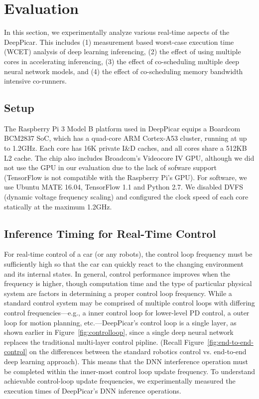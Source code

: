
\section{Evaluation}\label{sec:evaluation}

In this section, we experimentally analyze various real-time aspects
of the DeepPicar. This includes
(1) measurement based worst-case execution time (WCET) analysis of
deep learning inferencing,
(2) the effect of using multiple cores in accelerating inferencing,
(3) the effect of co-scheduling multiple deep neural network models,
and 
(4) the effect of co-scheduling memory bandwidth intensive co-runners.

\subsection{Setup}

The Raspberry Pi 3 Model B platform used in DeepPicar equips a Boardcom
BCM2837 SoC, which has a quad-core ARM Cortex-A53 cluster,
running at up to 1.2GHz. Each core has 16K private I\&D caches, and all
cores share a 512KB L2 cache.
The chip also includes Broadcom's Videocore IV
GPU, although we did not use the GPU in our evaluation due to the lack
of sofware support (TensorFlow is not compatible with the Raspberry Pi's GPU).
For software, we use Ubuntu MATE 16.04, TensorFlow 1.1 and Python
2.7. We disabled DVFS (dynamic voltage frequency scaling) and
configured the clock speed of each core statically at the maximum 1.2GHz.

\subsection{Inference Timing for Real-Time Control}

For real-time control of a car (or any robots), the control loop
frequency must be sufficiently high so that the car can quickly
react to the changing environment and its internal states. In general,
control performance improves when the frequency is higher, though
computation time and the type of particular physical system are
factors in determining a proper control loop frequency. While a standard
control system may be comprised of multiple control loops with
differing control frequencies---e.g., a inner control loop for lower-level
PD control, a outer loop for motion planning, etc.---DeepPicar's
control loop is a single layer, as shown earlier in
Figure~\ref{fig:controlloop}, since a single deep neural network
replaces the traditional multi-layer control pipline. (Recall
Figure~\ref{fig:end-to-end-control} on the differences between the
standard robotics control vs. end-to-end deep learning approach).
This means that the DNN interference operation must be completed
within the inner-most control loop update frequency. To understand
achievable control-loop update frequencies, we experimentally measured
the execution times of DeepPicar's DNN inference operations.

